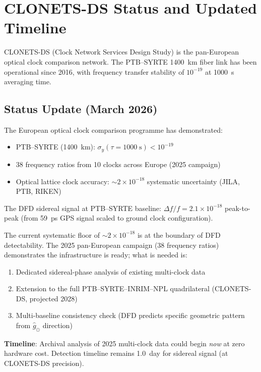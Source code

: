 \documentclass[11pt,a4paper]{article}
\newcounter{findingctr}
\newenvironment{finding}[1][]{%
  \refstepcounter{findingctr}%
  \begin{tcolorbox}[colback=blue!3!white, colframe=blue!50!black,
    title=\textbf{Finding \thefindingctr: #1}]
}{%
  \end{tcolorbox}%
}
\newcommand{\ee}[1]{\times 10^{#1}}
\begin{document}
\section{CLONETS-DS Status and Updated Timeline}

CLONETS-DS (Clock Network Services Design Study) is the pan-European
optical clock comparison network. The PTB--SYRTE 1400~km fiber link
has been operational since 2016, with frequency transfer stability
of $10^{-19}$ at 1000~s averaging time.

\subsection{Status Update (March 2026)}

\begin{finding}[European Clock Network: Approaching DFD Sensitivity]
\label{find:clonets}
The European optical clock comparison programme has demonstrated:
\begin{itemize}[nosep]
\item PTB--SYRTE (1400~km): $\sigma_y(\tau = 1000\;\text{s}) < 10^{-19}$
\item 38 frequency ratios from 10 clocks across Europe (2025 campaign)
\item Optical lattice clock accuracy: $\sim 2\ee{-18}$ systematic
  uncertainty (JILA, PTB, RIKEN)
\end{itemize}

The DFD sidereal signal at PTB--SYRTE baseline:
$\Delta f/f = 2.1\ee{-18}$ peak-to-peak (from 59~ps GPS signal
scaled to ground clock configuration).

The current systematic floor of $\sim 2\ee{-18}$ is at the boundary
of DFD detectability. The 2025 pan-European campaign (38 frequency
ratios) demonstrates the infrastructure is ready; what is needed is:
\begin{enumerate}[nosep]
\item Dedicated sidereal-phase analysis of existing multi-clock data
\item Extension to the full PTB--SYRTE--INRIM--NPL quadrilateral
  (CLONETS-DS, projected 2028)
\item Multi-baseline consistency check (DFD predicts specific
  geometric pattern from $\hat{g}_\odot$ direction)
\end{enumerate}

\textbf{Timeline}: Archival analysis of 2025 multi-clock data could
begin \emph{now} at zero hardware cost. Detection timeline remains
1.0~day for sidereal signal (at CLONETS-DS precision).
\end{finding}
\end{document}
